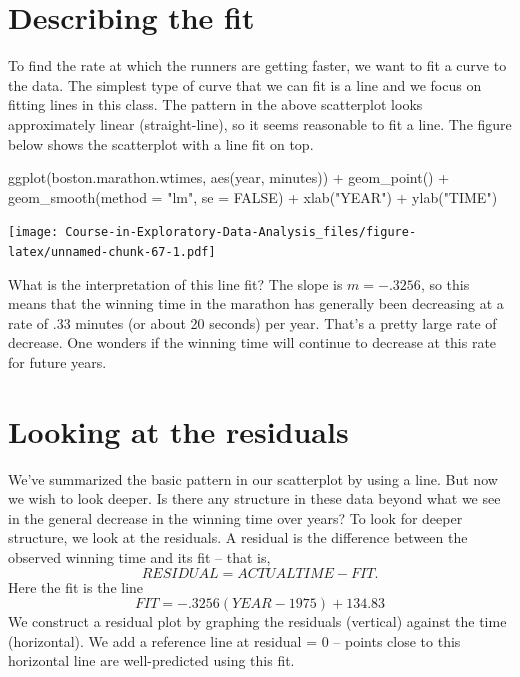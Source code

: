 \documentclass[
]{book}
\newenvironment{Shaded}{\begin{snugshade}}{\end{snugshade}}
\newcommand{\AttributeTok}[1]{\textcolor[rgb]{0.77,0.63,0.00}{#1}}
\newcommand{\ConstantTok}[1]{\textcolor[rgb]{0.00,0.00,0.00}{#1}}
\newcommand{\FunctionTok}[1]{\textcolor[rgb]{0.00,0.00,0.00}{#1}}
\newcommand{\NormalTok}[1]{#1}
\newcommand{\SpecialCharTok}[1]{\textcolor[rgb]{0.00,0.00,0.00}{#1}}
\newcommand{\StringTok}[1]{\textcolor[rgb]{0.31,0.60,0.02}{#1}}
\begin{document}
\hypertarget{describing-the-fit}{%
\section{Describing the fit}\label{describing-the-fit}}

To find the rate at which the runners are getting faster, we want to fit a curve to the data. The simplest type of curve that we can fit is a line and we focus on fitting lines in this class. The pattern in the above scatterplot looks approximately linear (straight-line), so it seems reasonable to fit a line. The figure below shows the scatterplot with a line fit on top.

\begin{Shaded}
\begin{Highlighting}[]
\FunctionTok{ggplot}\NormalTok{(boston.marathon.wtimes,}
       \FunctionTok{aes}\NormalTok{(year, minutes)) }\SpecialCharTok{+}
  \FunctionTok{geom\_point}\NormalTok{() }\SpecialCharTok{+}
  \FunctionTok{geom\_smooth}\NormalTok{(}\AttributeTok{method =} \StringTok{"lm"}\NormalTok{, }\AttributeTok{se =} \ConstantTok{FALSE}\NormalTok{) }\SpecialCharTok{+}
  \FunctionTok{xlab}\NormalTok{(}\StringTok{"YEAR"}\NormalTok{) }\SpecialCharTok{+} \FunctionTok{ylab}\NormalTok{(}\StringTok{"TIME"}\NormalTok{)}
\end{Highlighting}
\end{Shaded}

\texttt{[image: Course-in-Exploratory-Data-Analysis\_files/figure-latex/unnamed-chunk-67-1.pdf]}

What is the interpretation of this line fit? The slope is \(m = -.3256\), so this means that the winning time in the marathon has generally been decreasing at a rate of .33 minutes (or about 20 seconds) per year. That's a pretty large rate of decrease. One wonders if the winning time will continue to decrease at this rate for future years.

\hypertarget{looking-at-the-residuals}{%
\section{Looking at the residuals}\label{looking-at-the-residuals}}

We've summarized the basic pattern in our scatterplot by using a line. But now we wish to look deeper. Is there any structure in these data beyond what we see in the general decrease in the winning time over years? To look for deeper structure, we look at the residuals. A residual is the difference between the observed winning time and its fit -- that is,
\[
RESIDUAL = ACTUAL TIME - FIT .
\]
Here the fit is the line
\[
FIT = -.3256 (YEAR - 1975) + 134.83
\]
We construct a residual plot by graphing the residuals (vertical) against the time (horizontal). We add a reference line at residual = 0 -- points close to this horizontal line are well-predicted using this fit.
\end{document}
